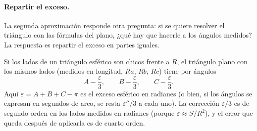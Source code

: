 \paragraph{Repartir el exceso.} La segunda aproximación responde otra pregunta: si se quiere
resolver el triángulo con las fórmulas del plano, ¿qué hay que hacerle a los ángulos medidos?
La respuesta es repartir el exceso en partes iguales.

\begin{teorema}[Legendre]\label{teo:legendre}
Si los lados de un triángulo esférico son chicos frente a \(R\), el triángulo plano con los
mismos lados (medidos en longitud, \(Ra\), \(Rb\), \(Rc\)) tiene por ángulos
\[
  A-\frac\varepsilon3,\qquad B-\frac\varepsilon3,\qquad C-\frac\varepsilon3.
\]
Aquí \(\varepsilon=A+B+C-\pi\) es el exceso esférico en radianes (o bien, si los ángulos se expresan en segundos de arco, se resta \(\varepsilon''/3\) a cada uno). La corrección \(\varepsilon/3\) es de segundo orden en los lados medidos en radianes (porque
\(\varepsilon\approx S/R^2\)), y el error que queda después de aplicarla es de cuarto orden.
\end{teorema}

